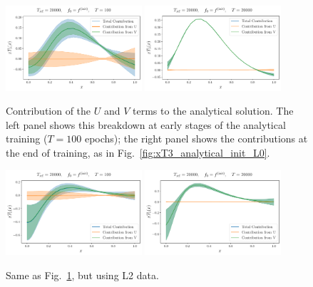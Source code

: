\begin{figure}[ht!]
    \centering
    \includegraphics[width=0.45\textwidth]{plots/analytical_solution/xT3/u_v_decomposition/L0/linear/evolution_u_v_100_L0_linear.pdf}
    \includegraphics[width=0.45\textwidth]{plots/analytical_solution/xT3/u_v_decomposition/L0/linear/evolution_u_v_20000_L0_linear.pdf}
    \caption{Contribution of the $U$ and $V$ terms to the analytical solution.
    The left panel shows this breakdown at early stages of the analytical
    training ($T=100$ epochs); the right panel shows the contributions at the
    end of training, as in Fig.~\ref{fig:xT3_analytical_init_L0}.}
    \label{fig:xT3_u_v_contributions_L0}
  \end{figure}

  \begin{figure}[ht!]
    \centering
    \includegraphics[width=0.45\textwidth]{plots/analytical_solution/xT3/u_v_decomposition/L2/linear/evolution_u_v_100_L2_linear.pdf}
    \includegraphics[width=0.45\textwidth]{plots/analytical_solution/xT3/u_v_decomposition/L2/linear/evolution_u_v_20000_L2_linear.pdf}
    \caption{Same as Fig.~\ref{fig:xT3_u_v_contributions_L0}, but using L2
    data.}
    \label{fig:xT3_u_v_contributions_L2}
  \end{figure}

